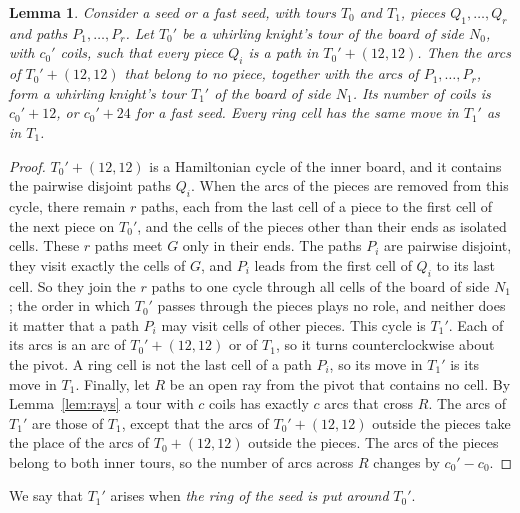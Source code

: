\documentclass[11pt]{amsart}
\newtheorem{lemma}[theorem]{Lemma}
\theoremstyle{remark}
\begin{document}
\begin{lemma}\label{lem:transplant}
Consider a seed or a fast seed, with tours $T_0$ and $T_1$, pieces $Q_1,\dots,Q_r$ and paths $P_1,\dots,P_r$. Let
$T_0'$ be a whirling knight's tour of the board of side $N_0$, with $c_0'$ coils, such that every piece $Q_i$ is a
path in $T_0'+(12,12)$. Then the arcs of $T_0'+(12,12)$ that belong to no piece, together with the arcs of
$P_1,\dots,P_r$, form a whirling knight's tour $T_1'$ of the board of side $N_1$. Its number of coils is
$c_0'+12$, or $c_0'+24$ for a fast seed. Every ring cell has the same move in $T_1'$ as in $T_1$.
\end{lemma}
\begin{proof}
$T_0'+(12,12)$ is a Hamiltonian cycle of the inner board, and it contains the pairwise disjoint paths $Q_i$. When
the arcs of the pieces are removed from this cycle, there remain $r$ paths, each from the last cell of a piece to
the first cell of the next piece on $T_0'$, and the cells of the pieces other than their ends as isolated cells.
These $r$ paths meet $G$ only in their ends. The paths $P_i$ are pairwise disjoint, they visit exactly the cells of
$G$, and $P_i$ leads from the first cell of $Q_i$ to its last cell. So they join the $r$ paths to one cycle through
all cells of the board of side $N_1$; the order in which $T_0'$ passes through the pieces plays no role, and
neither does it matter that a path $P_i$ may visit cells of other pieces. This cycle is $T_1'$. Each of its
arcs is an arc of $T_0'+(12,12)$ or of $T_1$, so it turns counterclockwise about the pivot. A ring cell is not the
last cell of a path $P_i$, so its move in $T_1'$ is its move in $T_1$. Finally, let $R$ be an open ray from the
pivot that contains no cell. By Lemma~\ref{lem:rays} a tour with $c$ coils has exactly $c$ arcs that cross $R$.
The arcs of $T_1'$ are those of $T_1$, except that the arcs of $T_0'+(12,12)$ outside the pieces take the place of
the arcs of $T_0+(12,12)$ outside the pieces. The arcs of the pieces belong to both inner tours, so the number of
arcs across $R$ changes by $c_0'-c_0$.
\end{proof}
We say that $T_1'$ arises when \emph{the ring of the seed is put around} $T_0'$.
\end{document}
